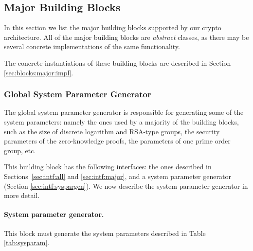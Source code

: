 
  \subsection{Major Building Blocks}
  \label{sec:blocks:major}
  
  In this section we list the major building blocks supported by our
  crypto architecture.
  All of the major building blocks are \emph{abstract} classes, as
  there may be several concrete implementations of the same functionality.

  The concrete instantiations of these building blocks are described in Section \ref{sec:blocks:major:impl}.
    \subsubsection{Global System Parameter Generator}

    The global system parameter generator is responsible for generating some of the
    system parameters: namely the ones used by a majority of the building blocks,
    such as the size of discrete logarithm
    and RSA-type groups, the security parameters of the zero-knowledge proofs,
    the parameters of one prime order group,
    etc.

    This building block has the following interfaces:
    the ones described in Sections~\ref{sec:intf:all} and \ref{sec:intf:major},
    and a system parameter generator (Section \ref{sec:intf:syspargen}).
    We now describe the system parameter generator in more detail.

    \paragraph{System parameter generator.}
    This block must generate the system parameters described in Table \ref{tab:sysparam}.

